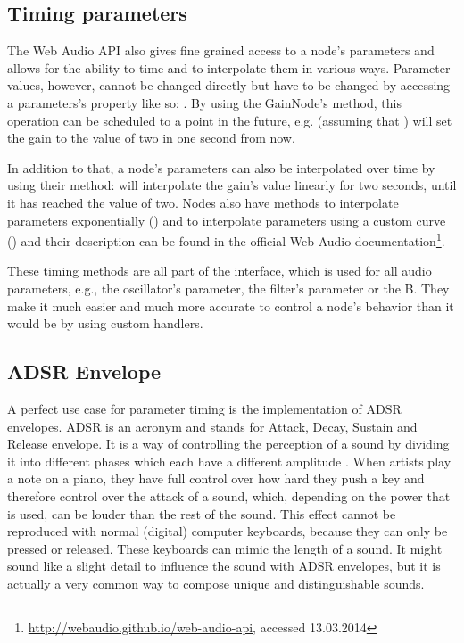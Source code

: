 \subsection{Timing parameters}

The Web Audio API also gives fine grained access to a node's parameters and allows for the ability to time and to interpolate them in various ways. Parameter values, however, cannot be changed directly but have to be changed by accessing a parameters's  property like so: . By using the GainNode's  method, this operation can be scheduled to a point in the future, e.g.  (assuming that ) will set the gain to the value of two in one second from now.

In addition to that, a node's parameters can also be interpolated over time by using their  method:  will interpolate the gain's value linearly for two seconds, until it has reached the value of two. Nodes also have methods to interpolate parameters exponentially () and to interpolate parameters using a custom curve () and their description can be found in the official Web Audio documentation\footnote{\url{http://webaudio.github.io/web-audio-api}, accessed 13.03.2014}.

These timing methods are all part of the  interface, which is used for all audio parameters, e.g., the oscillator's  parameter, the filter's  parameter or the B. They make it much easier and much more accurate to control a node's behavior than it would be by using custom  handlers.

\subsection{ADSR Envelope}
\label{sec:adsr-envelope}

A perfect use case for parameter timing is the implementation of ADSR envelopes. ADSR is an acronym and stands for Attack, Decay, Sustain and Release envelope. It is a way of controlling the perception of a sound by dividing it into different phases which each have a different amplitude \cite[p. 97]{curtis1996computer}. When artists play a note on a piano, they have full control over how hard they push a key and therefore control over the attack of a sound, which, depending on the power that is used, can be louder than the rest of the sound. This effect cannot be reproduced with normal (digital) computer keyboards, because they can only be pressed or released. These keyboards can mimic the length of a sound. It might sound like a slight detail to influence the sound with ADSR envelopes, but it is actually a very common way to compose unique and distinguishable sounds.

